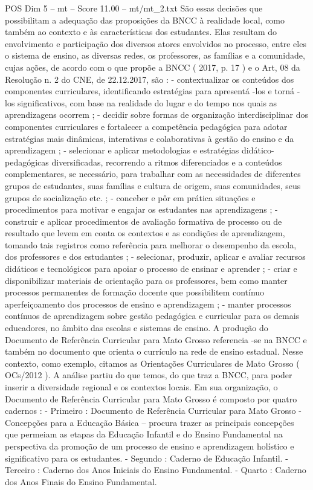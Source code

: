 \begin{textsample}{POS Dim 5 – mt – Score 11.00 – mt/mt\_2.txt}
São essas decisões que possibilitam a adequação das proposições da BNCC à realidade local, como também ao contexto e às características dos estudantes.
Elas resultam do envolvimento e participação dos diversos atores envolvidos no processo, entre eles o sistema de ensino, as diversas redes, os professores, as famílias e a comunidade, cujas ações, de acordo com o que propõe a BNCC ( 2017, p. 17 ) e o Art, 08 da Resolução n. 2 do CNE, de 22.12.2017, são : - contextualizar os conteúdos dos componentes curriculares, identificando estratégias para apresentá -los e torná -los significativos, com base na realidade do lugar e do tempo nos quais as aprendizagens ocorrem ; - decidir sobre formas de organização interdisciplinar dos componentes curriculares e fortalecer a competência pedagógica para adotar estratégias mais dinâmicas, interativas e colaborativas à gestão do ensino e da aprendizagem ; - selecionar e aplicar metodologias e estratégias didático-pedagógicas diversificadas, recorrendo a ritmos diferenciados e a conteúdos complementares, se necessário, para trabalhar com as necessidades de diferentes grupos de estudantes, suas famílias e cultura de origem, suas comunidades, seus grupos de socialização etc. ; - conceber e pôr em prática situações e procedimentos para motivar e engajar os estudantes nas aprendizagens ; - construir e aplicar procedimentos de avaliação formativa de processo ou de resultado que levem em conta os contextos e as condições de aprendizagem, tomando tais registros como referência para melhorar o desempenho da escola, dos professores e dos estudantes ; - selecionar, produzir, aplicar e avaliar recursos didáticos e tecnológicos para apoiar o processo de ensinar e aprender ; - criar e disponibilizar materiais de orientação para os professores, bem como manter processos permanentes de formação docente que possibilitem contínuo aperfeiçoamento dos processos de ensino e aprendizagem ; - manter processos contínuos de aprendizagem sobre gestão pedagógica e curricular para os demais educadores, no âmbito das escolas e sistemas de ensino.
A produção do Documento de Referência Curricular para Mato Grosso referencia -se na BNCC e também no documento que orienta o currículo na rede de ensino estadual.
Nesse contexto, como exemplo, citamos as Orientações Curriculares de Mato Grosso ( OCs/2012 ).
A análise partiu do que temos, do que traz a BNCC, para poder inserir a diversidade regional e os contextos locais.
Em sua organização, o Documento de Referência Curricular para Mato Grosso é composto por quatro cadernos : - Primeiro : Documento de Referência Curricular para Mato Grosso - Concepções para a Educação Básica – procura trazer as principais concepções que permeiam as etapas da Educação Infantil e do Ensino Fundamental na perspectiva da promoção de um processo de ensino e aprendizagem holístico e significativo para os estudantes. - Segundo : Caderno de Educação Infantil. - Terceiro : Caderno dos Anos Iniciais do Ensino Fundamental. - Quarto : Caderno dos Anos Finais do Ensino Fundamental.

\end{textsample}
